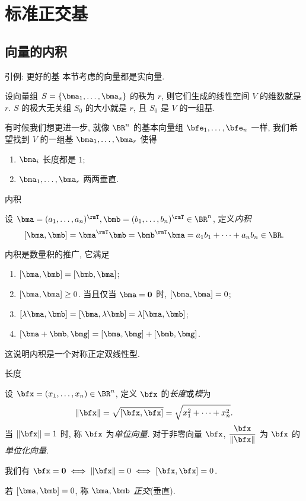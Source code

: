 \section{标准正交基}

\subsection{向量的内积}

\begin{frame}{引例: 更好的基}
	\onslide<+->
	本节考虑的向量都是实向量.

	\onslide<+->
	设向量组 $S=\{\bma_1,\dots,\bma_s\}$ 的秩为 $r$, 则它们生成的线性空间 $V$ 的维数就是 $r$.
	\onslide<+->
	$S$ 的极大无关组 $S_0$ 的大小就是 $r$, 且 $S_0$ 是 $V$ 的一组基.

	\onslide<+->
	有时候我们想更进一步, 就像 $\BR^n$ 的基本向量组 $\bfe_1,\dots,\bfe_n$ 一样, 我们希望找到 $V$ 的一组基 $\bma_1,\dots,\bma_r$ 使得
	\begin{enumerate}
		\item $\bma_i$ \alert{长度}都是 $1$;
		\item $\bma_1,\dots,\bma_r$ 两两\alert{垂直}.
	\end{enumerate}
\end{frame}


\begin{frame}{内积}
	\onslide<+->
	\begin{definition}
		设 $\bma=(a_1,\dots,a_n)^\rmT,\bmb=(b_1,\dots,b_n)^\rmT\in\BR^n$, 定义\emph{内积}
		\[[\bma,\bmb]=\bma^\rmT\bmb=\bmb^\rmT\bma=a_1b_1+\cdots+a_nb_n\in\BR.\]
	\end{definition}
	\onslide<+->
	内积是数量积的推广, 它满足
	\begin{enumerate}
		\item $[\bma,\bmb]=[\bmb,\bma]$;
		\item $[\bma,\bma]\ge 0$. 当且仅当 $\bma={\bf0}$ 时, $[\bma,\bma]=0$;
		\item $[\lambda\bma,\bmb]=[\bma,\lambda\bmb]=\lambda[\bma,\bmb]$;
		\item $[\bma+\bmb,\bmg]=[\bma,\bmg]+[\bmb,\bmg]$.
	\end{enumerate}
	\onslide<+->
	这说明内积是一个对称正定双线性型.
\end{frame}


\begin{frame}{长度}
	\onslide<+->
	\begin{definition}
		设 $\bfx=(x_1,\dots,x_n)\in\BR^n$, 定义 $\bfx$ 的\emph{长度}或\emph{模}为
		\[\|\bfx\|=\sqrt{[\bfx,\bfx]}=\sqrt{x_1^2+\cdots+x_n^2}.\]
		当 $\|\bfx\|=1$ 时, 称 $\bfx$ 为\emph{单位向量}.
		对于非零向量 $\bfx$, \alert{$\dfrac{\bfx}{\|\bfx\|}$} 为 $\bfx$ 的\emph{单位化向量}.
	\end{definition}
	\onslide<+->
	我们有 $\bfx={\bf0}\iff\|\bfx\|=0\iff[\bfx,\bfx]=0$.
	\onslide<+->
	\begin{definition}
		若 $[\bma,\bmb]=0$, 称 $\bma,\bmb$ \emph{正交}(垂直).
	\end{definition}
\end{frame}


